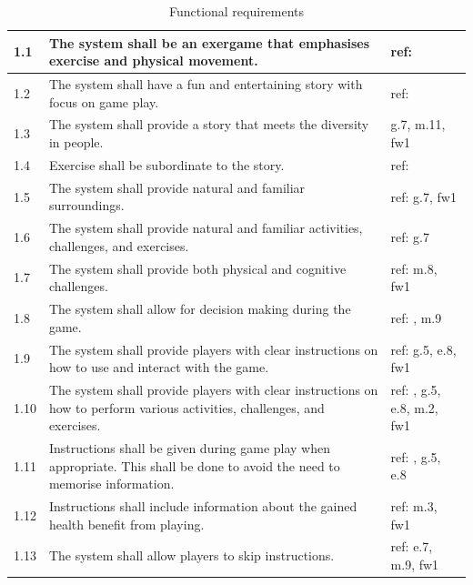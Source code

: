 \begin{table} [H]
\centering
\begin{tabular}{|>{\raggedright}p{}|p{}|p{}|}
\hline
1.1 & The system shall be an exergame that emphasises exercise and physical movement. & ref: \cite{project} \\ \hline
1.2 & The system shall have a fun and entertaining story with focus on game play.  & ref: \cite{project} \cite{zyda2005visual} \\ \hline
1.3 & The system shall provide a story that meets the diversity in people. & g.7, m.11, fw1 \\ \hline
1.4 & Exercise shall be subordinate to the story.  & ref:\cite{zyda2005visual} \\ \hline
1.5 & The system shall provide natural and familiar surroundings.  & ref: g.7, fw1\\ \hline
1.6 & The system shall provide natural and familiar activities, challenges, and exercises. & ref: g.7 \\ \hline
1.7 & The system shall provide both physical and cognitive challenges. & ref: m.8, fw1 \\ \hline
1.8 & The system shall allow for decision making during the game. & ref: \cite{understandingvg}, m.9 \\ \hline
1.9 & The system shall provide players with clear instructions on how to use and interact with the game. & ref: g.5, e.8, fw1 \\ \hline
1.10 & The system shall provide players with clear instructions on how to perform various activities, challenges, and exercises. & ref: \cite{sweetser}, g.5, e.8, m.2, fw1\\ \hline
1.11 & Instructions shall be given during game play when appropriate. This shall be done to avoid the need to memorise information. & ref: \cite{sweetser}, g.5, e.8 \\ \hline
1.12 & Instructions shall include information about the gained health benefit from playing. & ref: m.3, fw1\\ \hline
1.13 & The system shall allow players to skip instructions. & ref: \cite{sweetser} e.7, m.9, fw1 \\ \hline 

    \end{tabular}
    \caption[Functional requirements, part 1]{Functional requirements}
    \label{tab:func1}
\end{table} 

